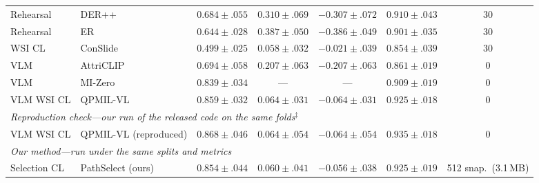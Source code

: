 \documentclass{article}
\begin{document}
\begin{table}[t]
\begin{tabular}{llccccc}
Rehearsal & DER++ \cite{buzzega2020derpp} & $0.684{\pm}.055$ & $0.310{\pm}.069$ & $-0.307{\pm}.072$ & $0.910{\pm}.043$ & 30 \\
Rehearsal & ER \cite{chaudhry2019er} & $0.644{\pm}.028$ & $0.387{\pm}.050$ & $-0.386{\pm}.049$ & $0.901{\pm}.035$ & 30 \\
WSI CL & ConSlide \cite{huang2023conslide} & $0.499{\pm}.025$ & $0.058{\pm}.032$ & $-0.021{\pm}.039$ & $0.854{\pm}.039$ & 30 \\
VLM & AttriCLIP \cite{wang2023attriclip} & $0.694{\pm}.058$ & $0.207{\pm}.063$ & $-0.207{\pm}.063$ & $0.861{\pm}.019$ & 0 \\
VLM & MI-Zero \cite{lu2023mizero} & $0.839{\pm}.034$ & --- & --- & $0.909{\pm}.019$ & 0 \\
VLM WSI CL & QPMIL-VL \cite{gou2025qpmil} & $0.859{\pm}.032$ & $0.064{\pm}.031$ & $-0.064{\pm}.031$ & $0.925{\pm}.018$ & 0 \\
\midrule
\multicolumn{7}{l}{\emph{Reproduction check---our run of the released code on the same folds$^\ddagger$}} \\
VLM WSI CL & QPMIL-VL (reproduced) & $0.868{\pm}.046$ & $0.064{\pm}.054$ & $-0.064{\pm}.054$ & $0.935{\pm}.018$ & 0 \\
\midrule
\multicolumn{7}{l}{\emph{Our method---run under the same splits and metrics}} \\
Selection CL & PathSelect (ours) & $0.854{\pm}.044$ & $0.060{\pm}.041$ & $-0.056{\pm}.038$ & $0.925{\pm}.019$ & 512 snap.\ (3.1\,MB) \\
\bottomrule
\end{tabular}
\end{table}
\end{document}
